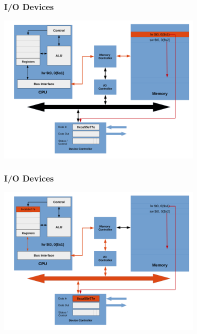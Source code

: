 \documentclass{beamer}
\begin{document}
\begin{frame}%
\frametitle{I/O Devices}

\vspace*{-0.2cm}
\begin{center}
\hspace*{-1cm}\includegraphics[width=10cm]{io_device3.pdf}
\end{center}

\end{frame}

\begin{frame}%
\frametitle{I/O Devices}

\vspace*{-0.2cm}
\begin{center}
\hspace*{-1cm}\includegraphics[width=10cm]{io_device4.pdf}
\end{center}

\end{frame}
\end{document}
